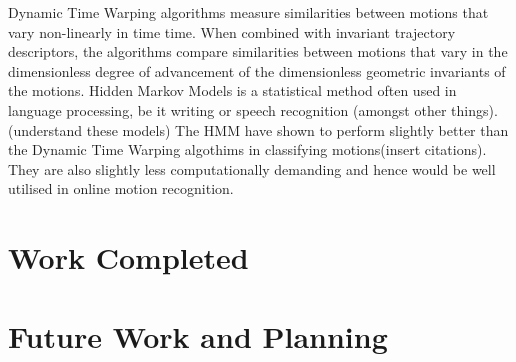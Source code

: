 \documentclass{article}
\begin{document}
Dynamic Time Warping algorithms measure similarities between motions that vary non-linearly in time time. When combined with invariant trajectory descriptors, the algorithms compare similarities between motions that vary in the dimensionless degree of advancement of the dimensionless geometric invariants of the motions. 
Hidden Markov Models is a statistical method often used in language processing, be it writing or speech recognition (amongst other things). (understand these models) 
The HMM have shown to perform slightly better than the Dynamic Time Warping algothims in classifying motions(insert citations). They are also slightly less computationally demanding and hence would be well utilised in online motion recognition.
\section{Work Completed}

\section{Future Work and Planning}
 
\end{document}
